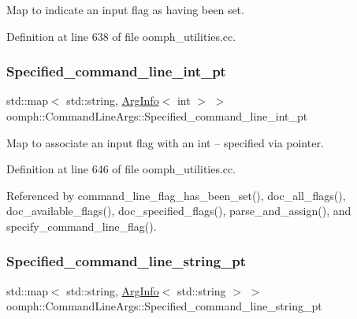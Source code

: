 Map to indicate an input flag as having been set. 



Definition at line 638 of file oomph\+\_\+utilities.\+cc.

\mbox{\label{namespaceoomph_1_1CommandLineArgs_a872a9f3ad510078d12dc24f19dd54f88}} 
\subsubsection{\texorpdfstring{Specified\+\_\+command\+\_\+line\+\_\+int\+\_\+pt}{Specified\_command\_line\_int\_pt}}
{\footnotesize\ttfamily std\+::map$<$ std\+::string, \hyperlink{structoomph_1_1CommandLineArgs_1_1ArgInfo}{Arg\+Info}$<$ int $>$ $>$ oomph\+::\+Command\+Line\+Args\+::\+Specified\+\_\+command\+\_\+line\+\_\+int\+\_\+pt}



Map to associate an input flag with an int -- specified via pointer. 



Definition at line 646 of file oomph\+\_\+utilities.\+cc.



Referenced by command\+\_\+line\+\_\+flag\+\_\+has\+\_\+been\+\_\+set(), doc\+\_\+all\+\_\+flags(), doc\+\_\+available\+\_\+flags(), doc\+\_\+specified\+\_\+flags(), parse\+\_\+and\+\_\+assign(), and specify\+\_\+command\+\_\+line\+\_\+flag().

\mbox{\label{namespaceoomph_1_1CommandLineArgs_a6801e3bd896891e4c5b40399c56df332}} 
\subsubsection{\texorpdfstring{Specified\+\_\+command\+\_\+line\+\_\+string\+\_\+pt}{Specified\_command\_line\_string\_pt}}
{\footnotesize\ttfamily std\+::map$<$ std\+::string, \hyperlink{structoomph_1_1CommandLineArgs_1_1ArgInfo}{Arg\+Info}$<$ std\+::string $>$ $>$ oomph\+::\+Command\+Line\+Args\+::\+Specified\+\_\+command\+\_\+line\+\_\+string\+\_\+pt}



